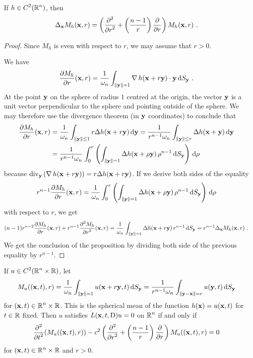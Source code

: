 \begin{prop} \label{wave_sol_pr1}
If $\displaystyle h \in C^2(\RR^n)$, then
\[
\Delta_{\VEC{x}} M_h(\VEC{x},r)
= \left( \pdydxn{}{r}{2} + \left(\frac{n-1}{r}\right) \pdydx{}{r} \right)
M_h(\VEC{x},r) \ .
\]
\end{prop}

\begin{proof}
Since $M_h$ is even with respect to $r$, we may assume that $r>0$.

We have
\[
\pdydx{M_h}{r}(\VEC{x},r)
= \frac{1}{\omega_n} \int_{\|\VEC{y}\|=1} \graD h(\VEC{x} + r \VEC{y})
\cdot \VEC{y} \dss{S}{y} \ .
\]
At the point $\VEC{y}$ on the sphere of radius $1$ centred at the
origin, the vector $\VEC{y}$ is a unit vector perpendicular to 
the sphere and pointing outside of the sphere.  We may therefore use
the divergence theorem (in $\VEC{y}$ coordinates) to conclude that
\begin{align*}
\pdydx{M_h}{r}(\VEC{x},r)
&= \frac{1}{\omega_n} \int_{\|\VEC{y}\|\leq 1} r \Delta h(\VEC{x} + r \VEC{y}) 
\dx{\VEC{y}}
= \frac{1}{r^{n-1} \omega_n} \int_{\|\VEC{y}\|\leq r} \Delta h(\VEC{x}+\VEC{y}) 
\dx{\VEC{y}} \\
&= \frac{1}{r^{n-1} \omega_n} \int_0^r \left( \int_{\|\VEC{y}\|= 1}
\Delta h(\VEC{x} + \rho \VEC{y}) \, \rho^{n-1} \dss{S}{y} \right) \dx{\rho}
\end{align*}
because
$\displaystyle \diV_{\VEC{y}} \left( \graD h(\VEC{x} + r \VEC{y}) \right)
= r \Delta h(\VEC{x} + r \VEC{y})$.
If we derive both sides of the equality
\[
r^{n-1} \pdydx{M_h}{r}(\VEC{x},r) =
\frac{1}{\omega_n} \int_0^r \left( \int_{\|\VEC{y}\|= 1}
\Delta h(\VEC{x} + \rho \VEC{y})\, \rho^{n-1} \dss{S}{y} \right) \dx{\rho}
\]
with respect to $r$, we get
\[
(n-1) r^{n-2} \pdydx{M_h}{r}(\VEC{x},r) 
+ r^{n-1} \pdydxn{M_h}{r}{2}(\VEC{x},r) 
= \frac{1}{\omega_n} \int_{\|\VEC{y}\|= 1}
\Delta h(\VEC{x} + r \VEC{y}) \, r^{n-1} \dss{S}{y}
= r^{n-1} \Delta_{\VEC{x}} M_h(\VEC{x},r) \ .
\]
We get the conclusion of the proposition by dividing both side of the
previous equality by $\displaystyle r^{n-1}$.
\end{proof}

\begin{cor} %
If $\displaystyle u \in C^2(\RR^n \times \RR)$, let  \label{wave_sol_oaCOR}
\[
M_u( (\VEC{x},t), r) =
\frac{1}{\omega_n} \int_{\|\VEC{y}\|=1} u(\VEC{x} + r \VEC{y},t) 
\dss{S}{y}
= \frac{1}{r^{n-1} \omega_n}
\int_{\|\VEC{y}-\VEC{x}\|=r} u(\VEC{y},t) \dss{S}{y}
\]
for $\displaystyle (\VEC{x},t) \in \RR^n \times \RR$.  This is the
spherical mean of the function $h(\VEC{x}) = u(\VEC{x},t)$ for
$t\in \RR$ fixed.  Then 
$u$ satisfies $\displaystyle L(\VEC{x},t,\diff)u=0$ on
$\displaystyle \RR^n$ if and only if
\begin{equation} \label{wave_sol_oa}
\pdfdxn{ \left(
M_u((\VEC{x},t),r)\right) }{t}{2} \\
- c^2 \left( \pdydxn{}{r}{2} + \left(\frac{n-1}{r}\right) \pdydx{}{r} \right)
M_u((\VEC{x},t),r) = 0
\end{equation}
for $\displaystyle (\VEC{x},t) \in \RR^n \times \RR$ and $r>0$.
\end{cor}

